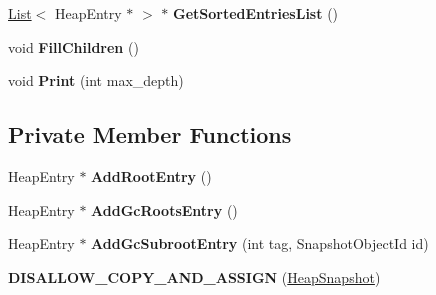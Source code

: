 \begin{DoxyCompactItemize}
\item 
\hyperlink{classv8_1_1internal_1_1_list}{List}$<$ Heap\+Entry $\ast$ $>$ $\ast$ {\bfseries Get\+Sorted\+Entries\+List} ()\hypertarget{classv8_1_1internal_1_1_heap_snapshot_a7b7b95d8cda3864b7115ca15a6fc5462}{}\label{classv8_1_1internal_1_1_heap_snapshot_a7b7b95d8cda3864b7115ca15a6fc5462}

\item 
void {\bfseries Fill\+Children} ()\hypertarget{classv8_1_1internal_1_1_heap_snapshot_afa5230c9502d22f7441b990892c91dd8}{}\label{classv8_1_1internal_1_1_heap_snapshot_afa5230c9502d22f7441b990892c91dd8}

\item 
void {\bfseries Print} (int max\+\_\+depth)\hypertarget{classv8_1_1internal_1_1_heap_snapshot_a3c183f20e6935d16ec6a852cfb77b252}{}\label{classv8_1_1internal_1_1_heap_snapshot_a3c183f20e6935d16ec6a852cfb77b252}

\end{DoxyCompactItemize}
\subsection*{Private Member Functions}
\begin{DoxyCompactItemize}
\item 
Heap\+Entry $\ast$ {\bfseries Add\+Root\+Entry} ()\hypertarget{classv8_1_1internal_1_1_heap_snapshot_a5c776b850845839a7a1d2faa0ec68cda}{}\label{classv8_1_1internal_1_1_heap_snapshot_a5c776b850845839a7a1d2faa0ec68cda}

\item 
Heap\+Entry $\ast$ {\bfseries Add\+Gc\+Roots\+Entry} ()\hypertarget{classv8_1_1internal_1_1_heap_snapshot_a11461ab41ce2a57e6f44c0bca23811f7}{}\label{classv8_1_1internal_1_1_heap_snapshot_a11461ab41ce2a57e6f44c0bca23811f7}

\item 
Heap\+Entry $\ast$ {\bfseries Add\+Gc\+Subroot\+Entry} (int tag, Snapshot\+Object\+Id id)\hypertarget{classv8_1_1internal_1_1_heap_snapshot_affd23021987aee45152d7350b07fc0cb}{}\label{classv8_1_1internal_1_1_heap_snapshot_affd23021987aee45152d7350b07fc0cb}

\item 
{\bfseries D\+I\+S\+A\+L\+L\+O\+W\+\_\+\+C\+O\+P\+Y\+\_\+\+A\+N\+D\+\_\+\+A\+S\+S\+I\+GN} (\hyperlink{classv8_1_1internal_1_1_heap_snapshot}{Heap\+Snapshot})\hypertarget{classv8_1_1internal_1_1_heap_snapshot_a6749681b466ecd774a7edca8f9d6451c}{}\label{classv8_1_1internal_1_1_heap_snapshot_a6749681b466ecd774a7edca8f9d6451c}

\end{DoxyCompactItemize}
